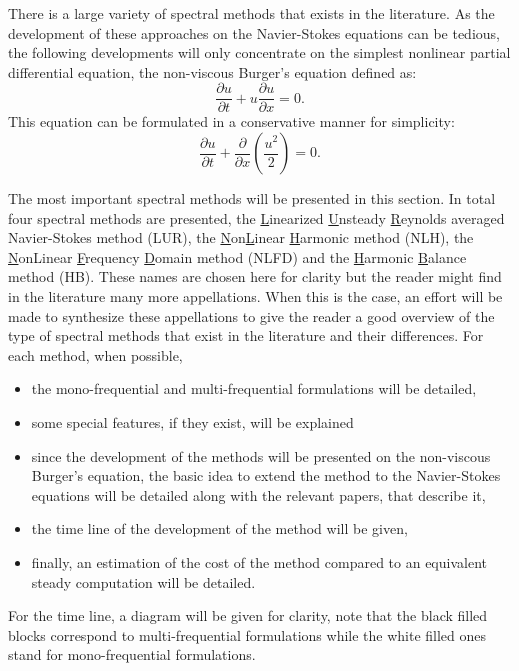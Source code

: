 
There is a large variety of spectral methods that exists in the
literature. 
As the development of these approaches on the Navier-Stokes equations
can be tedious, the following developments 
will only concentrate on the simplest
nonlinear partial differential equation, 
the non-viscous Burger's equation defined as:
\begin{equation}
	\frac{\partial u}{\partial t} + 
	u \frac{\partial u}{\partial x} = 
	0.
	\label{eq:sm_nonlinear_convection}
\end{equation}
This equation can be formulated in a conservative manner for simplicity:
\begin{equation}
	\frac{\partial u}{\partial t} + 
	\frac{\partial}{\partial x} \left( \frac{u^2}{2} \right) = 
	0.
	\label{eq:sm_nonlinear_convection_conservative}
\end{equation}



The most important spectral methods will be presented in this section.
In total four spectral methods are presented, 
the \underline{L}inearized \underline{U}nsteady 
\underline{R}eynolds averaged
Navier-Stokes method (LUR), 
the \underline{N}on\underline{L}inear 
\underline{H}armonic method (NLH), the \underline{N}onLinear 
\underline{F}requency \underline{D}omain
method (NLFD) and the \underline{H}armonic \underline{B}alance 
method (HB).
These names are chosen here
for clarity but the reader might find in the literature many more
appellations. When this is the case, an effort will be made to synthesize
these appellations to give the reader a good 
overview of the type of spectral methods that exist in the literature
and their differences.
For each method, when possible,
\begin{itemize}
 	\item the mono-frequential and multi-frequential 
 	formulations will be detailed,
 	\item some special features, if they exist, will be explained
 	\item since the development of the methods will be 
 	presented on the non-viscous 
 	Burger's equation, 
	the basic idea to extend the method to the Navier-Stokes
	equations will be detailed along with the relevant papers,
	that describe it,
	\item the time line of the development 
	of the method will be given,
	\item finally, an estimation of the cost of the method 
	compared to an equivalent steady computation will be detailed.
\end{itemize}
For the time line, a diagram will be given for clarity, note
that the black filled blocks correspond to multi-frequential
formulations while the white filled ones stand for mono-frequential
formulations.
